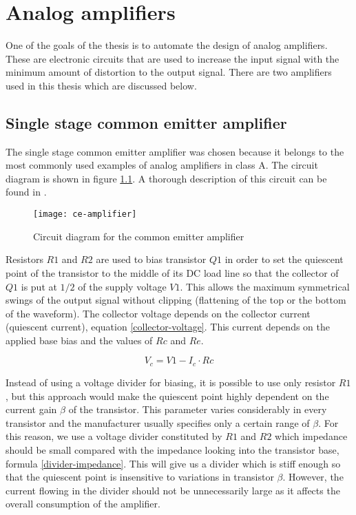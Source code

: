 \chapter{Analog amplifiers}
One of the goals of the thesis is to automate the design of analog amplifiers. These are electronic circuits that are used to increase the input signal with the minimum amount of distortion to the output signal. There are two amplifiers used in this thesis which are discussed below.

\section{Single stage common emitter amplifier} \label{ce-amp}
The single stage common emitter amplifier was chosen because it belongs to the most commonly used examples of analog amplifiers in class A. The circuit diagram is shown in figure \ref{ce-amplifier}. A thorough description of this circuit can be found in \cite{the-art-of-electronics}.

\begin{figure}[H]
    \centering
    \texttt{[image: ce-amplifier]}
    \label{ce-amplifier}
    \caption{Circuit diagram for the common emitter amplifier}
\end{figure}

Resistors $R1$ and $R2$ are used to bias transistor $Q1$ in order to set the quiescent point of the transistor to the middle of its DC load line so that the collector of $Q1$ is put at $1/2$ of the supply voltage $V1$. This allows the maximum symmetrical swings of the output signal without clipping (flattening of the top or the bottom of the waveform). The collector voltage depends on the collector current (quiescent current), equation \ref{collector-voltage}. This current depends on the applied base bias and the values of $Rc$ and $Re$.

\begin{equation} \label{collector-voltage}
    V_c = V1 - I_c \cdot Rc
\end{equation}

Instead of using a voltage divider for biasing, it is possible to use only resistor $R1$, but this approach would make the quiescent point highly dependent on the current gain $\beta$ of the transistor. This parameter varies considerably in every transistor and the manufacturer usually specifies only a certain range of $\beta$. For this reason, we use a voltage divider constituted by $R1$ and $R2$ which impedance should be small compared with the impedance looking into the transistor base, formula \ref{divider-impedance}. This will give us a divider which is stiff enough so that the quiescent point is insensitive to variations in transistor $\beta$. However, the current flowing in the divider should not be unnecessarily large as it affects the overall consumption of the amplifier.

